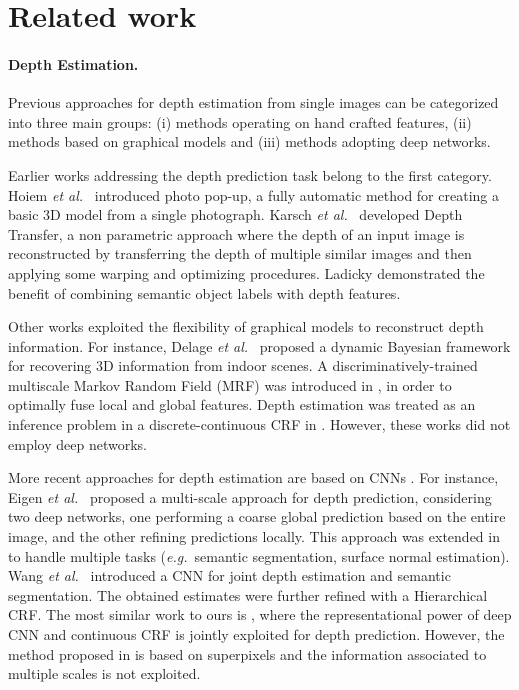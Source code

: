 \documentclass[10pt,twocolumn,letterpaper]{article}
\def\eg{\textit{e.g.}~}
\def\etal{\textit{et al.}~}
\begin{document}
%
 



\section{Related work}
\paragraph{Depth Estimation.} Previous approaches for depth estimation from single images can be categorized into three main 
groups: (i) methods operating on hand crafted features, (ii) methods based on 
graphical models and (iii) methods adopting deep networks.

Earlier works addressing the depth prediction task belong to the first category.
Hoiem \etal \cite{hoiem2005automatic} introduced photo pop-up, a 
fully automatic method for creating a basic 3D model from a single photograph. 
Karsch \etal \cite{karsch2014depth} developed Depth Transfer, a non parametric approach where
the depth of an input image is reconstructed by transferring the depth of multiple similar images and then applying some
warping and optimizing procedures. Ladicky \cite{ladicky2014pulling} demonstrated the benefit of combining semantic object 
labels with depth features.
\vspace{-0.05cm}
\par Other works exploited the flexibility of graphical models to reconstruct depth information.
For instance, Delage \etal \cite{delage2006dynamic} proposed a dynamic Bayesian
framework for recovering 3D information from indoor scenes. A discriminatively-trained 
multiscale Markov Random Field (MRF) was introduced in \cite{saxena20083}, in order to optimally fuse 
local and global features. Depth estimation was treated as an inference problem in a 
discrete-continuous CRF in \cite{liu2014discrete}. However, these works did not 
employ deep networks.
\vspace{-0.05cm}
\par More recent approaches for depth estimation are based on CNNs \cite{eigen2015predicting,liu2015deep,wang2015towards,roymonocular,laina2016deeper}.
For instance, Eigen \etal \cite{eigen2014depth} proposed a multi-scale approach for depth prediction,
considering two deep networks, one performing a coarse global prediction
based on the entire image, and the other refining predictions locally. This approach
was extended in \cite{eigen2015predicting} to handle multiple tasks (\eg semantic segmentation,
surface normal estimation). Wang \etal \cite{wang2015towards} introduced a CNN for joint depth estimation 
and semantic segmentation. The obtained estimates were further refined with a Hierarchical CRF. 
The most similar work to ours is \cite{liu2015deep}, where the 
representational power of deep CNN and continuous CRF is jointly exploited for depth prediction.
However, the method proposed in \cite{liu2015deep} is based on superpixels and the
information associated to multiple scales is not exploited. \vspace{-3mm} \vspace{-0.3cm}
\end{document}
